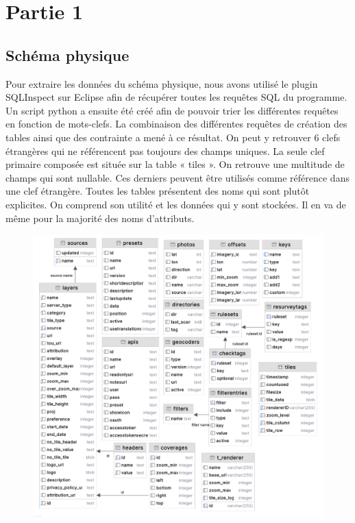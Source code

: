 \section{Partie 1}
\subsection{Schéma physique}
Pour extraire les données du schéma physique, nous avons utilisé le plugin SQLInspect sur Eclipse afin de récupérer toutes les requêtes SQL du programme. Un script python a ensuite été créé afin de pouvoir trier les différentes requêtes en fonction de mots-clefs. La combinaison des différentes requêtes de création des tables ainsi que des contrainte a mené à ce résultat. On peut y retrouver 6 clefs étrangères qui ne référencent pas toujours des champs uniques. La seule clef primaire composée est située sur la table « tiles ». On retrouve une multitude de champs qui sont nullable. Ces derniers peuvent être utilisés comme référence dans une clef étrangère.
Toutes les tables présentent des noms qui sont plutôt explicites. On comprend son utilité et les données qui y sont stockées. Il en va de même pour la majorité des noms d'attributs.
\begin{figure}[h!]
    \centering
    \includegraphics[scale=1]{schema_physique.png}
    \label{fig:schéma physique}
\end{figure}

